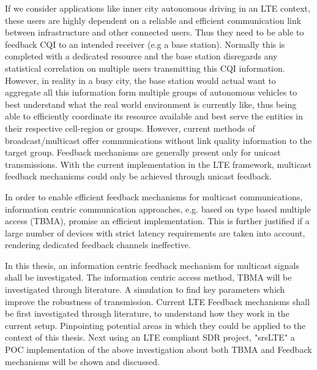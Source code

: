 \documentclass{article}
\begin{document}
If we consider applications like inner city autonomous driving in an LTE context, these users are highly dependent on a reliable and efficient communication link between infrastructure and other connected users. Thus they need to be able to feedback \ac{CQI} to an intended receiver (e.g a base station). Normally this is completed with a dedicated resource and the base station disregards any statistical correlation on multiple users transmitting this \ac{CQI} information. However, in reality in a busy city, the base station would actual want to aggregate all this information form multiple groups of autonomous vehicles to best understand what the real world environment is currently like, thus being able to efficiently coordinate its resource available and best serve the entities in their respective cell-region or groups. However, current methods of broadcast/multicast offer communications without link quality information to the target group. Feedback mechanisms are generally present only for unicast transmissions. With the current implementation in the LTE framework, multicast feedback mechanisms could only be achieved through unicast feedback.

In order to enable efficient feedback mechanisms for multicast communications, information centric communication approaches, e.g. based on type based multiple access (TBMA)\cite{tbma}, promise an efficient implementation. This is further justified if a large number of devices with strict latency requirements are taken into account, rendering dedicated feedback channels ineffective. 

In this thesis, an information centric feedback mechanism for multicast signals shall be investigated. The information centric access method, \ac{TBMA}  will be investigated through literature. A simulation to find key parameters which improve the robustness of transmission.
Current LTE Feedback mechanisms shall be first investigated through literature, to understand how they work in the current setup. Pinpointing potential areas in which they could be applied to the context of this thesis. Next using an LTE compliant SDR project, "srsLTE" a \ac{POC} implementation of the above investigation about both \ac{TBMA} and Feedback mechanisms will be shown and discussed. 
\end{document}
